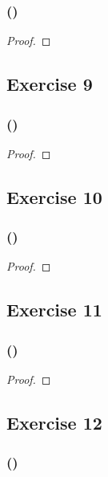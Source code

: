\documentclass[14pt]{extarticle}
\begin{document}
\subsubsection{()}

\begin{proof}

\end{proof}

\subsection{Exercise 9}

\subsubsection{()}

\begin{proof}

\end{proof}

\subsection{Exercise 10}

\subsubsection{()}

\begin{proof}

\end{proof}

\subsection{Exercise 11}

\subsubsection{()}

\begin{proof}

\end{proof}

\subsection{Exercise 12}

\subsubsection{()}
\end{document}
